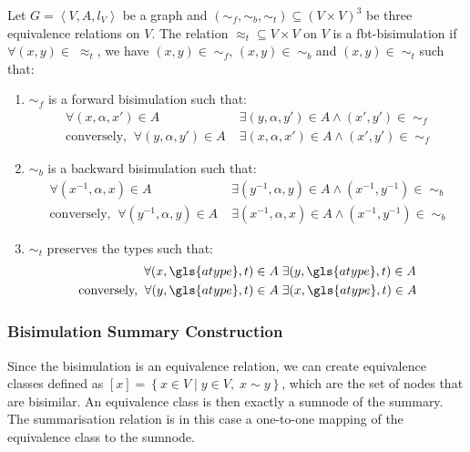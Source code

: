 \begin{definition}
Let $G=\left\langle V, A, l_V \right\rangle$ be a graph and $(\sim_f, \sim_b, \sim_t) \subseteq (V \times V)^3$ be three equivalence relations on $V$.
The relation $\approx_t \subseteq V \times V$ on $V$ is a fbt-bisimulation if $\forall (x,y) \in\; \approx_t$, we have $(x,y) \in\; \sim_f$, $(x,y) \in\; \sim_b$ and $(x,y) \in\; \sim_t$ such that:
\begin{enumerate}
\item $\sim_f$ is a forward bisimulation such that:
$$
\begin{aligned}
\forall (x, \alpha, x') \in A&\; \exists (y, \alpha, y') \in A \wedge (x',y') \in\; \sim_f \\
\text{conversely,}\;\; \forall (y, \alpha, y') \in A&\; \exists (x, \alpha, x') \in A \wedge (x',y') \in\; \sim_f
\end{aligned}
$$

\item $\sim_b$ is a backward bisimulation such that:
$$
\begin{aligned}
\forall (x^{-1}, \alpha, x) \in A&\; \exists (y^{-1}, \alpha, y) \in A \wedge (x^{-1}, y^{-1}) \in\; \sim_b \\
\text{conversely,}\;\; \forall (y^{-1}, \alpha, y) \in A&\; \exists (x^{-1}, \alpha, x) \in A \wedge (x^{-1}, y^{-1}) \in\; \sim_b
\end{aligned}
$$

\item $\sim_t$ preserves the types such that:
$$
\begin{aligned}
\forall (x, \gls{atype}, t) \in A&\; \exists (y, \gls{atype}, t) \in A \\
\text{conversely,}\;\; \forall (y, \gls{atype}, t) \in A&\; \exists (x, \gls{atype}, t) \in A
\end{aligned}
$$

\end{enumerate}
\end{definition}

\subsubsection{Bisimulation Summary Construction}

Since the bisimulation is an equivalence relation, we can create equivalence classes defined as $[x] = \left\lbrace x \in V \mid y \in V,\; x \sim y \right\rbrace$, which are the set of nodes that are bisimilar. An equivalence class is then exactly a sumnode of the summary. The summarisation relation is in this case a one-to-one mapping of the equivalence class to the sumnode.

